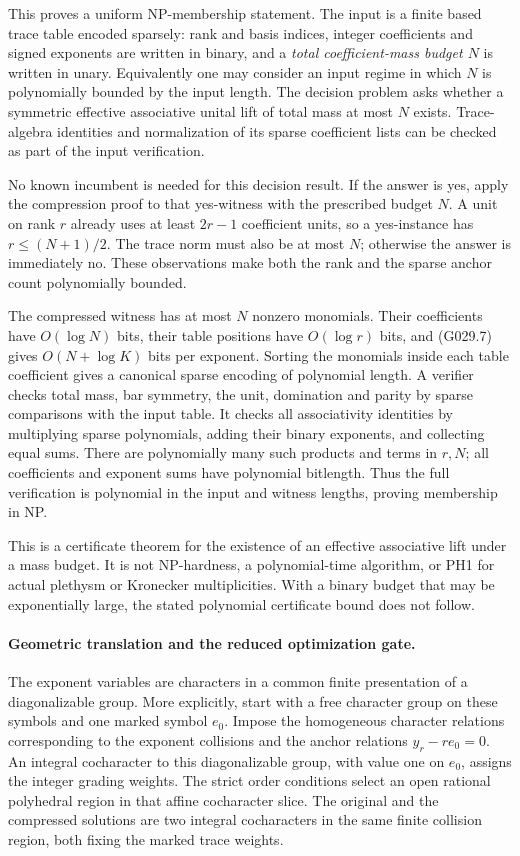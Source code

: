 This proves a uniform NP-membership statement. The input
is a finite based trace table encoded sparsely: rank and
basis indices, integer coefficients and signed exponents
are written in binary, and a \emph{total coefficient-mass
budget $N$} is written in unary. Equivalently one may
consider an input regime in which $N$ is polynomially
bounded by the input length. The decision problem asks
whether a symmetric effective associative unital lift
of total mass at most $N$ exists. Trace-algebra identities
and normalization of its sparse coefficient lists can
be checked as part of the input verification.

No known incumbent is needed for this decision result.
If the answer is yes, apply the compression proof to
that yes-witness with the prescribed budget $N$.
A unit on rank $r$ already uses at least $2r-1$ coefficient
units, so a yes-instance has $r\le(N+1)/2$. The trace
norm must also be at most $N$; otherwise the answer is
immediately no. These observations make both the rank
and the sparse anchor count polynomially bounded.

The compressed witness has at most $N$ nonzero monomials.
Their coefficients have $O(\log N)$ bits, their table
positions have $O(\log r)$ bits, and (G029.7) gives
$O(N+\log K)$ bits per exponent. Sorting the monomials
inside each table coefficient gives a canonical sparse
encoding of polynomial length. A verifier checks total
mass, bar symmetry, the unit, domination and parity by
sparse comparisons with the input table. It checks all
associativity identities by multiplying sparse polynomials,
adding their binary exponents, and collecting equal sums.
There are polynomially many such products and terms in
$r,N$; all coefficients and exponent sums have polynomial
bitlength. Thus the full verification is polynomial in
the input and witness lengths, proving membership in NP.

This is a certificate theorem for the existence of an
effective associative lift under a mass budget. It is
not NP-hardness, a polynomial-time algorithm, or PH1 for
actual plethysm or Kronecker multiplicities. With a binary
budget that may be exponentially large, the stated
polynomial certificate bound does not follow.

\paragraph{Geometric translation and the reduced optimization gate.}
The exponent variables are characters in a common finite
presentation of a diagonalizable group. More explicitly,
start with a free character group on these symbols and
one marked symbol $e_0$. Impose the homogeneous character
relations corresponding to the exponent collisions and
the anchor relations $y_r-r e_0=0$. An integral cocharacter
to this diagonalizable group, with value one on $e_0$,
assigns the integer grading weights. The strict order
conditions select an open rational polyhedral region
in that affine cocharacter slice. The original and the
compressed solutions are two integral cocharacters in
the same finite collision region, both fixing the marked
trace weights.

